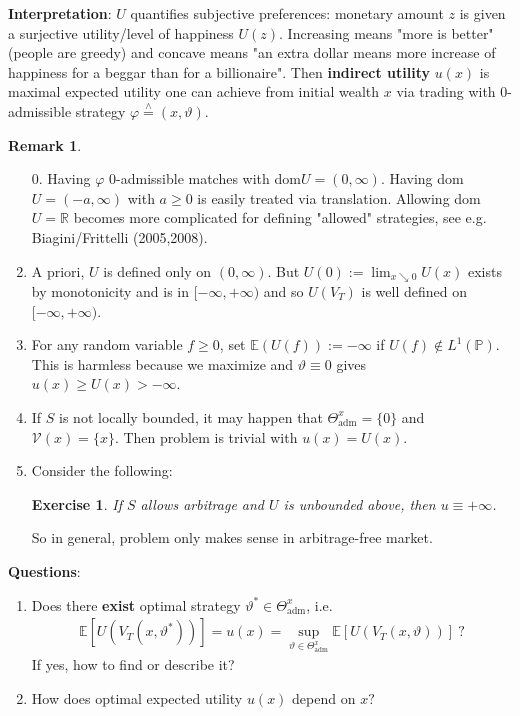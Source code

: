 \documentclass[12pt,a4paper, twoside]{article}
\newtheorem{exe}{Exercise}[section]
\theoremstyle{definition}
\newtheorem{rem}{Remark}[section]
\newcommand{\EE}{\mathbb{E}} %
\newcommand{\PP}{\mathbb{P}} %
\newcommand{\teq}{\overset{\wedge}{=}}
\begin{document}
\noindent \textbf{Interpretation}: $U$ quantifies subjective preferences: monetary amount $z$ is given a surjective utility/level of happiness $U(z)$. Increasing means "more is better" (people are greedy) and concave means "an extra dollar means more increase of happiness for a beggar than for a billionaire". Then \textbf{indirect utility} $u(x)$ is maximal expected utility one can achieve from initial wealth $x$ via trading with $0$-admissible strategy $\varphi \teq (x, \vartheta)$. 
\newpage
\begin{rem} \
\begin{enumerate}
\item[0.] Having $\varphi$ $0$-admissible matches with dom$U=(0, \infty)$. Having dom$U=(-a, \infty)$ with $a \geq 0$ is easily treated via translation. Allowing dom$U= \mathbb{R}$ becomes more complicated for defining "allowed" strategies, see e.g. Biagini/Frittelli (2005,2008). 
\item A priori, $U$ is defined only on $(0, \infty)$. But $U(0):= \lim_{x \searrow 0} U(x)$ exists by monotonicity and is in $[- \infty, + \infty)$ and so $U(V_T)$ is well defined on $[- \infty,+ \infty)$. 
\item For any random variable $f \geq 0$, set $\EE(U(f)):= - \infty$ if $U(f) \notin L^1(\PP)$. This is harmless because we maximize and $\vartheta \equiv 0$ gives $u(x) \geq U(x) > - \infty$. 
\item If $S$ is not locally bounded, it may happen that $\Theta_\text{adm}^x = \{0\}$ and $\mathcal{V}(x)= \{ x \}$. Then problem is trivial with $u(x)=U(x)$.  
\item Consider the following:
\begin{exe} If $S$ allows arbitrage and $U$ is unbounded above, then $u \equiv + \infty$.
\end{exe}
So in general, problem only makes sense in arbitrage-free market. 
\end{enumerate}
\end{rem} 
\noindent \textbf{Questions}: 
\begin{enumerate}[label=(\alph*)]
\item Does there \textbf{exist} optimal strategy $\vartheta^* \in \Theta_\text{adm}^x$, i.e.
\begin{align*}
\EE[ U (V_T(x, \vartheta^*))]= u(x) = \sup_{ \vartheta \in \Theta_\text{adm}^x} \EE[ U(V_T(x, \vartheta))] \ ? 
\end{align*}
If yes, how to find or describe it?
\item How does optimal expected utility $u(x)$ depend on $x?$
\end{enumerate}
\end{document}
